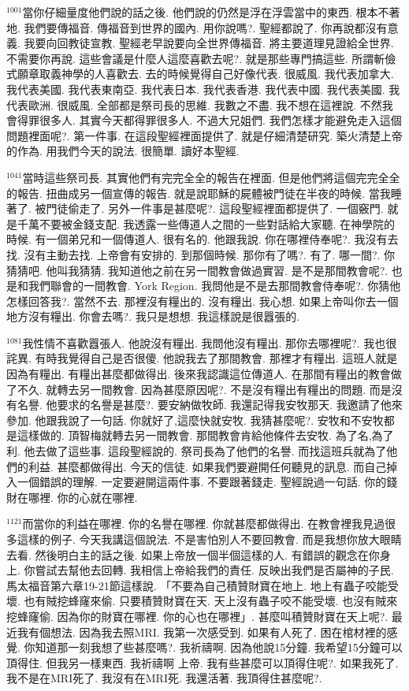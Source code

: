 \documentclass{book}
\begin{document}
$^{1001}$當你仔細量度他們說的話之後.
他們說的仍然是浮在浮雲當中的東西.
根本不著地.
我們要傳福音.
傳福音到世界的國內.
用你說嗎?.
聖經都說了.
你再說都沒有意義.
我要向回教徒宣教.
聖經老早說要向全世界傳福音.
將主要道理見證給全世界.
不需要你再說.
這些會議是什麼人這麼喜歡去呢?.
就是那些專門搞這些.
所謂斬儉式願章取義神學的人喜歡去.
去的時候覺得自己好像代表.
很威風.
我代表加拿大.
我代表美國.
我代表東南亞.
我代表日本.
我代表香港.
我代表中國.
我代表美國.
我代表歐洲.
很威風.
全部都是祭司長的思維.
我數之不盡.
我不想在這裡說.
不然我會得罪很多人.
其實今天都得罪很多人.
不過大兄姐們.
我們怎樣才能避免走入這個問題裡面呢?.
第一件事.
在這段聖經裡面提供了.
就是仔細清楚研究.
築火清楚上帝的作為.
用我們今天的說法.
很簡單.
讀好本聖經.

$^{1041}$當時這些祭司長.
其實他們有完完全全的報告在裡面.
但是他們將這個完完全全的報告.
扭曲成另一個宣傳的報告.
就是說耶穌的屍體被門徒在半夜的時候.
當我睡著了.
被門徒偷走了.
另外一件事是甚麼呢?.
這段聖經裡面都提供了.
一個竅門.
就是千萬不要被金錢支配.
我透露一些傳道人之間的一些對話給大家聽.
在神學院的時候.
有一個弟兄和一個傳道人.
很有名的.
他跟我說.
你在哪裡侍奉呢?.
我沒有去找.
沒有主動去找.
上帝會有安排的.
到那個時候.
那你有了嗎?.
有了.
哪一間?.
你猜猜吧.
他叫我猜猜.
我知道他之前在另一間教會做過實習.
是不是那間教會呢?.
也是和我們聯會的一間教會.
York Region.
我問他是不是去那間教會侍奉呢?.
你猜他怎樣回答我?.
當然不去.
那裡沒有糧出的.
沒有糧出.
我心想.
如果上帝叫你去一個地方沒有糧出.
你會去嗎?.
我只是想想.
我這樣說是很囂張的.

$^{1081}$我性情不喜歡囂張人.
他說沒有糧出.
我問他沒有糧出.
那你去哪裡呢?.
我也很詫異.
有時我覺得自己是否很傻.
他說我去了那間教會.
那裡才有糧出.
這班人就是因為有糧出.
有糧出甚麼都做得出.
後來我認識這位傳道人.
在那間有糧出的教會做了不久.
就轉去另一間教會.
因為甚麼原因呢?.
不是沒有糧出有糧出的問題.
而是沒有名譽.
他要求的名譽是甚麼?.
要安納做牧師.
我還記得我安牧那天.
我邀請了他來參加.
他跟我說了一句話.
你就好了,這麼快就安牧.
我猜甚麼呢?.
安牧和不安牧都是這樣做的.
頂智梅就轉去另一間教會.
那間教會肯給他條件去安牧.
為了名,為了利.
他去做了這些事.
這段聖經說的.
祭司長為了他們的名譽.
而找這班兵就為了他們的利益.
甚麼都做得出.
今天的信徒.
如果我們要避開任何聽見的訊息.
而自己掉入一個錯誤的理解.
一定要避開這兩件事.
不要跟著錢走.
聖經說過一句話.
你的錢財在哪裡.
你的心就在哪裡.

$^{1121}$而當你的利益在哪裡.
你的名譽在哪裡.
你就甚麼都做得出.
在教會裡我見過很多這樣的例子.
今天我講這個說法.
不是害怕別人不要回教會.
而是我想你放大眼睛去看.
然後明白主的話之後.
如果上帝放一個半個這樣的人.
有錯誤的觀念在你身上.
你嘗試去幫他去回轉.
我相信上帝給我們的責任.
反映出我們是否屬神的子民.
馬太福音第六章19-21節這樣說.
「不要為自己積贊財寶在地上.
地上有蟲子咬能受壞.
也有賊挖蜂窿來偷.
只要積贊財寶在天.
天上沒有蟲子咬不能受壞.
也沒有賊來挖蜂窿偷.
因為你的財寶在哪裡.
你的心也在哪裡」.
甚麼叫積贊財寶在天上呢?.
最近我有個想法.
因為我去照MRI.
我第一次感受到.
如果有人死了.
困在棺材裡的感覺.
你知道那一刻我想了些甚麼嗎?.
我祈禱啊.
因為他說15分鐘.
我希望15分鐘可以頂得住.
但我另一樣東西.
我祈禱啊 上帝.
我有些甚麼可以頂得住呢?.
如果我死了.
我不是在MRI死了.
我沒有在MRI死.
我還活著.
我頂得住甚麼呢?.
\end{document}
